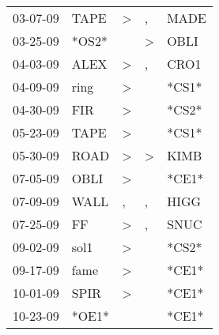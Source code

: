 \begin{supertabular}{p{0.07\textwidth}p{0.06\textwidth}p{0.02\textwidth}p{0.02\textwidth}p{0.06\textwidth}}
          03-07-09\textsuperscript{} &           TAPE\textsuperscript{} &     \textgreater &                , &           MADE\textsuperscript{} \\
          03-25-09\textsuperscript{} &                            *OS2* &                  &     \textgreater &           OBLI\textsuperscript{} \\
          04-03-09\textsuperscript{} &           ALEX\textsuperscript{} &     \textgreater &                , &           CRO1\textsuperscript{} \\
          04-09-09\textsuperscript{} &           ring\textsuperscript{} &     \textgreater &                  &                            *CS1* \\
          04-30-09\textsuperscript{} &            FIR\textsuperscript{} &     \textgreater &                  &                            *CS2* \\
          05-23-09\textsuperscript{} &           TAPE\textsuperscript{} &     \textgreater &                  &                            *CS1* \\
          05-30-09\textsuperscript{} &           ROAD\textsuperscript{} &     \textgreater &     \textgreater &           KIMB\textsuperscript{} \\
          07-05-09\textsuperscript{} &           OBLI\textsuperscript{} &     \textgreater &                  &                            *CE1* \\
          07-09-09\textsuperscript{} &           WALL\textsuperscript{} &                , &                , &           HIGG\textsuperscript{} \\
          07-25-09\textsuperscript{} &             FF\textsuperscript{} &     \textgreater &                , &           SNUC\textsuperscript{} \\
          09-02-09\textsuperscript{} &           sol1\textsuperscript{} &     \textgreater &                  &                            *CS2* \\
          09-17-09\textsuperscript{} &           fame\textsuperscript{} &     \textgreater &                  &                            *CE1* \\
          10-01-09\textsuperscript{} &           SPIR\textsuperscript{} &     \textgreater &                  &                            *CE1* \\
          10-23-09\textsuperscript{} &                            *OE1* &                  &                  &                            *CE1* \\

\end{supertabular}
